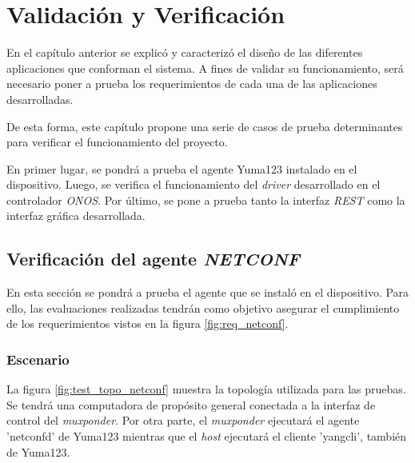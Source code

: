 
\chapter{Validación y Verificación} %
\label{Chapter5} %


En el capítulo anterior se explicó y caracterizó el diseño de las diferentes aplicaciones que conforman el sistema. A fines de validar su funcionamiento, será necesario poner a prueba los requerimientos de cada una de las aplicaciones desarrolladas. 

De esta forma, este capítulo propone una serie de casos de prueba determinantes para verificar el funcionamiento del proyecto. 

En primer lugar, se pondrá a prueba el agente Yuma123 instalado en el dispositivo. Luego, se verifica el funcionamiento del \textit{driver} desarrollado en el controlador \textit{ONOS}. Por último, se pone a prueba tanto la interfaz \textit{REST} como la interfaz gráfica desarrollada.


\section{Verificación del agente \textit{NETCONF}}

En esta sección se pondrá a prueba el agente que se instaló en el dispositivo. Para ello, las evaluaciones realizadas tendrán como objetivo asegurar el cumplimiento de los requerimientos vistos en la figura \ref{fig:req_netconf}.

\subsection{Escenario}

La figura \ref{fig:test_topo_netconf} muestra la topología utilizada para las pruebas. Se tendrá una computadora de propósito general conectada a la interfaz de control del \textit{muxponder}. Por otra parte, el \textit{muxponder} ejecutará el agente 'netconfd' de Yuma123 mientras que el \textit{host} ejecutará el cliente 'yangcli', también de Yuma123.

